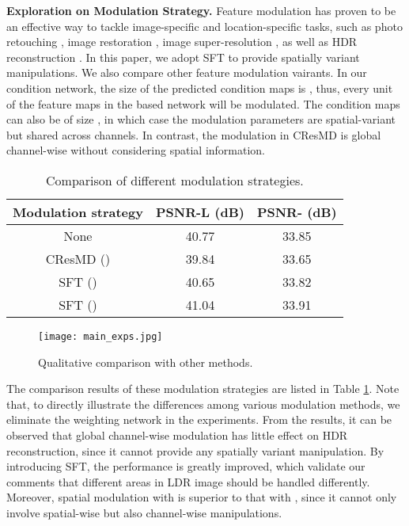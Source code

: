 \documentclass[final]{cvpr}
\begin{document}
\textbf{Exploration on Modulation Strategy.}
Feature modulation has proven to be an effective way to tackle image-specific and location-specific tasks, such as photo retouching \cite{he2020conditional}, image restoration \cite{he2019modulating, he2019interactive}, image super-resolution \cite{wang2018recovering}, as well as HDR reconstruction \cite{kim2019deep}. In this paper, we adopt SFT to provide spatially variant manipulations. We also compare other feature modulation vairants. In our condition network, the size of the predicted condition maps is , thus, every unit of the feature maps in the based network will be modulated. The condition maps can also be of size , in which case the modulation parameters are spatial-variant but shared across channels. In contrast, the modulation in CResMD \cite{he2019interactive} is global channel-wise without considering spatial information.

\begin{table}[htbp]
	\begin{center}
		\begin{tabular}{ccc}
			\toprule
			Modulation strategy & PSNR-L (dB) & PSNR- (dB) \\ \hline
			None & 40.77 & 33.85 \\ 
			CResMD () & 39.84 & 33.65 \\ 
			SFT () & 40.65 & 33.82 \\ 
			SFT () & 41.04 & 33.91 \\ 
			\bottomrule
		\end{tabular}
	\end{center}
	\caption{Comparison of different modulation strategies.}
	\label{tab:modulation}
\end{table}

\begin{figure*}[htbp]
    \begin{center}
    \texttt{[image: main\_exps.jpg]}
    \end{center}
    \caption{Qualitative comparison with other methods.}
    \label{Fig: main_exp}
\end{figure*}

The comparison results of these modulation strategies are listed in Table \ref{tab:modulation}. Note that, to directly illustrate the differences among various modulation methods, we eliminate the weighting network in the experiments. From the results, it can be observed that global channel-wise modulation has little effect on HDR reconstruction, since it cannot provide any spatially variant manipulation. By introducing SFT, the performance is greatly improved, which validate our comments that different areas in LDR image should be handled differently. Moreover, spatial modulation with  is superior to that with , since it cannot only involve spatial-wise but also channel-wise manipulations.
\end{document}
